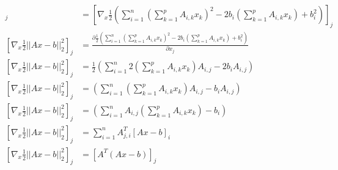 \documentclass[a4paper,10pt]{article}
\begin{document}
\subsection{} 
\label{P2} 
\begin{align*} 
[\nabla_{x} \frac{1}{2}||Ax - b||^{2}_{2}]_{j} &= [\nabla_{x} \frac{1}{2}(\sum^{n}_{i = 1} (\sum^{p}_{k = 1} A_{i, k}x_{k})^{2} - 2b_{i}(\sum^{p}_{k = 1} A_{i, k}x_{k}) + b_{i}^{2})]_{j}\\ 
[\nabla_{x} \frac{1}{2}||Ax - b||^{2}_{2}]_{j} &= \frac{\partial\frac{1}{2}(\sum^{n}_{i = 1} (\sum^{p}_{k = 1} A_{i, k}x_{k})^{2} - 2b_{i}(\sum^{p}_{k = 1} A_{i, k}x_{k}) + b_{i}^{2})}{\partial x_{j}}\\ 
[\nabla_{x} \frac{1}{2}||Ax - b||^{2}_{2}]_{j} &= \frac{1}{2}(\sum^{n}_{i = 1} 2(\sum^{p}_{k = 1} A_{i, k}x_{k})A_{i, j} - 2b_{i} A_{i, j})\\ 
[\nabla_{x} \frac{1}{2}||Ax - b||^{2}_{2}]_{j} &= (\sum^{n}_{i = 1} (\sum^{p}_{k = 1} A_{i, k}x_{k})A_{i, j} - b_{i} A_{i, j})\\ 
[\nabla_{x} \frac{1}{2}||Ax - b||^{2}_{2}]_{j} &= (\sum^{n}_{i = 1} A_{i, j}(\sum^{p}_{k = 1} A_{i, k}x_{k}) - b_{i} )\\ 
[\nabla_{x} \frac{1}{2}||Ax - b||^{2}_{2}]_{j} &= \sum^{n}_{i = 1} A^{T}_{j, i}[Ax - b]_{i}\\ 
[\nabla_{x} \frac{1}{2}||Ax - b||^{2}_{2}]_{j} &= [A^{T}(Ax - b)]_{j} 
\end{align*} 
\end{document}
